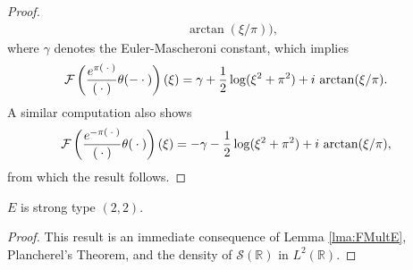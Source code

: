 \documentclass[../dissertation.tex]{subfiles}
\begin{document}
\begin{proof}
\begin{align*}
					\arctan(\xi/\pi)
				\big),
				\nonumber
	\end{align*}
	where $\gamma$ denotes the Euler-Mascheroni constant, which implies
	\begin{align}
		\mathcal F \left( 
			 \frac{e^{\pi (\kern 0.5ex \cdot \kern 0.5ex)}}{(\kern 0.5ex \cdot \kern 0.5ex)} \theta(-\kern 0.5ex \cdot \kern 0.5ex)
		\right)(\xi)
			&=
				\gamma
				+ \frac{1}{2} \log(\xi^2 + \pi^2) 
				+ i \, \arctan(\xi/\pi).
	\end{align}
	A similar computation also shows 
	\begin{align}
		\mathcal F \left( 
			 \frac{e^{-\pi (\kern 0.5ex \cdot \kern 0.5ex)}}{(\kern 0.5ex \cdot \kern 0.5ex)} \theta(\kern 0.5ex \cdot \kern 0.5ex)
		\right)(\xi)
			&= 
				- \gamma
				- \frac{1}{2} \log(\xi^2 + \pi^2) 
				+ i \, \arctan(\xi/\pi),
	\end{align}
	from which the result follows.
\end{proof}

\begin{thm}\label{thm:Estrong}
	$E$ is strong type $(2, 2)$.
\end{thm}
\begin{proof}
	This result is an immediate consequence of Lemma \ref{lma:FMultE}, 
	Plancherel's Theorem, and the density of $\mathscr S(\mathbb R)$ 
	in $L^2(\mathbb R)$.
\end{proof}
\end{document}
